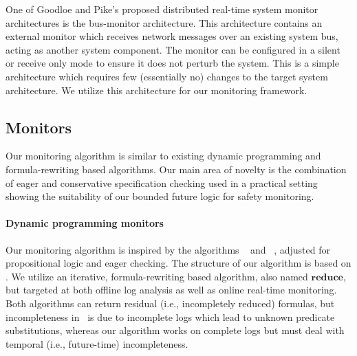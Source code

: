 One of Goodloe and Pike's proposed distributed real-time system monitor architectures is the bus-monitor architecture.
This architecture contains an external monitor which receives network messages over an existing system bus, acting as another system component.
The monitor can be configured in a silent or receive only mode to ensure it does not perturb the system. 
This is a simple architecture which requires few (essentially no) changes to the target system architecture. We utilize this architecture for our monitoring framework. 


\subsection{Monitors}
Our monitoring algorithm is similar to existing dynamic programming and formula-rewriting based algorithms. 
Our main area of novelty is the combination of eager and conservative specification checking used in a practical setting showing the suitability of our bounded future logic for safety monitoring.
\paragraph{Dynamic programming monitors}
Our monitoring algorithm is inspired by the algorithms \greduce\ \cite{Garg2011} and \precis\ \cite{Chowdhury2014}, adjusted for propositional logic and eager checking. 
The structure of our algorithm is based on \greduce{}. 
We utilize an iterative, formula-rewriting based algorithm, also named $\mathbf{reduce}$, but targeted at both offline log analysis as well as online real-time monitoring. 
Both algorithms can return residual (i.e., incompletely reduced) formulas, but incompleteness in \greduce\ is due to incomplete logs which lead to unknown predicate substitutions, whereas our algorithm works on complete logs but must deal with temporal (i.e., future-time) incompleteness. 


